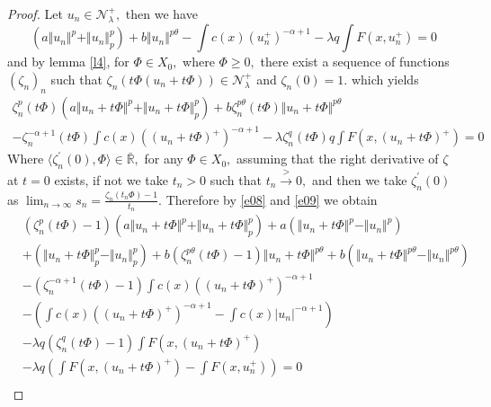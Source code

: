 \documentclass[10pt,twoside,reqno,centertags,draft]{amsart}
\begin{document}
\begin{proof}
Let $ u_n \in \mathcal{N}_{\lambda}^{+},$ then we have
\begin{equation}\label{e08}
\left( a \Vert u_n \Vert^p + \Vert u_n \Vert_{p}^{p}\right) + b \Vert u_n \Vert^{p \theta}  - \int c(x)(u_n^+)^{-\alpha+1} - \lambda q \int F(x,u_n^+) = 0 
\end{equation}
and by lemma \ref{l4}, for $ \Phi \in X_0,$ where $ \Phi \geq 0,$ there exist a sequence of functions $ (\zeta_n)_n$ such that 
$ \zeta_n(t\Phi(u_n +t\Phi)) \in \mathcal{N}_{\lambda}^{+}$ and $ \zeta_n(0) =1.$ which yields
\begin{equation}\label{e09}
\begin{split}
\zeta_n^{p}(t\Phi) \left( a \Vert u_n +t\Phi \Vert^p + \Vert u_n +t\Phi \Vert_{p}^{p}\right) + b \zeta_n^{p\theta}(t\Phi) \Vert u_n +t\Phi \Vert^{p \theta}\\ 
-\zeta_n^{-\alpha+1}(t\Phi) \int c(x)((u_n +t\Phi)^+)^{-\alpha+1} - \lambda \zeta_n^{q}(t\Phi) q \int F(x,(u_n +t\Phi)^+) = 0 
\end{split}
\end{equation} 
Where $ \langle\zeta_n^{\prime}(0), \Phi\rangle \in \bar{\mathbb{R}},$ for any $ \Phi \in X_0,$ assuming that the right derivative of $ \zeta$ at $ t =0$ exists,
if not we take $ t_n >0$ such that $ t_n \xrightarrow{>} 0,$ and then we take $ \zeta_n^{\prime}(0)$ as $ \lim_{n \to \infty} s_n =\frac{\zeta_n(t_n\Phi) -1}{t_n}.$ Therefore by \ref{e08} and \ref{e09} we obtain
\begin{equation}
\begin{aligned}
&(\zeta_n^{p}(t\Phi) -1) \left(a\Vert u_n +t\Phi \Vert^p + \Vert u_n +t\Phi \Vert_{p}^{p}\right)+a\left(\Vert u_n +t\Phi \Vert^p -\Vert u_n \Vert^p\right)\\ 
& +\left(\Vert u_n +t\Phi \Vert_{p}^{p}-\Vert u_n \Vert_{p}^{p}\right) +b (\zeta_n^{p\theta}(t\Phi) -1) \Vert u_n +t\Phi \Vert^{p \theta}  +b\left(\Vert u_n +t\Phi \Vert^{p \theta} -\Vert u_n \Vert^{p \theta}\right)\\
&-(\zeta_n^{-\alpha+1}(t\Phi) -1)\int c(x)((u_n +t\Phi)^+)^{-\alpha+1}\\
&-\left(\int c(x)((u_n +t\Phi)^+)^{-\alpha+1} -\int c(x)\vert u_n\vert^{-\alpha+1}\right)\\
&-\lambda q (\zeta_n^{q}(t\Phi) -1) \int F(x,(u_n +t\Phi)^+)\\
& -\lambda q \left(\int F(x,(u_n +t\Phi)^+) -\int F(x,u_n^+)\right) =0\\
\end{aligned}

\end{equation}
\end{proof}
\end{document}
